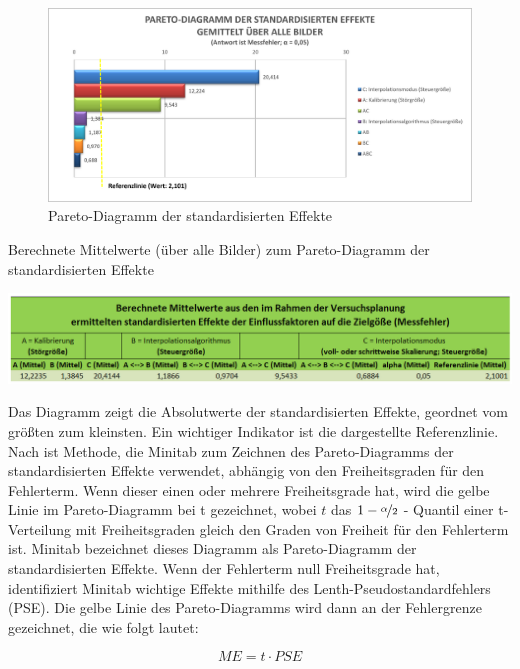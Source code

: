 \documentclass[
fontsize=10pt, 
listof = totoc,
parskip = half	
]{report}
\begin{document}
\begin{figure}[H]
	\centering
	\includegraphics[width=14cm, height=\textheight, keepaspectratio]{pics/DA_Pareto}
	\caption{Pareto-Diagramm der standardisierten Effekte}
	\label{fig:DAPareto}
\end{figure}

\begin{table}[H]
	\caption{Berechnete Mittelwerte (über alle Bilder) zum Pareto-Diagramm der standardisierten Effekte}
	\label{tab:DAPareto}
	\centering
	\includegraphics[width=\textwidth,height=\textheight,keepaspectratio]{pics/Tab_DA_Pareto}
\end{table}

\noindent Das Diagramm zeigt die Absolutwerte der standardisierten Effekte, geordnet vom größten zum kleinsten. Ein wichtiger Indikator ist die dargestellte Referenzlinie. Nach \cite{minitab_pareto} ist Methode, die Minitab zum Zeichnen des Pareto-Diagramms der standardisierten Effekte verwendet, abhängig von den Freiheitsgraden für den Fehlerterm. Wenn dieser einen oder mehrere Freiheitsgrade hat, wird die gelbe Linie im Pareto-Diagramm bei t gezeichnet, wobei $t$ das $1-\nicefrac{\alpha}{2}$ - Quantil einer t-Verteilung mit Freiheitsgraden gleich den Graden von Freiheit für den Fehlerterm ist. Minitab bezeichnet dieses Diagramm als Pareto-Diagramm der standardisierten Effekte. Wenn der Fehlerterm null Freiheitsgrade hat, identifiziert Minitab wichtige Effekte mithilfe des Lenth-Pseudostandardfehlers (PSE). Die gelbe Linie des Pareto-Diagramms wird dann an der Fehlergrenze gezeichnet, die wie folgt lautet:

\begin{equation}
	ME = t\cdot PSE
\end{equation}
\end{document}

